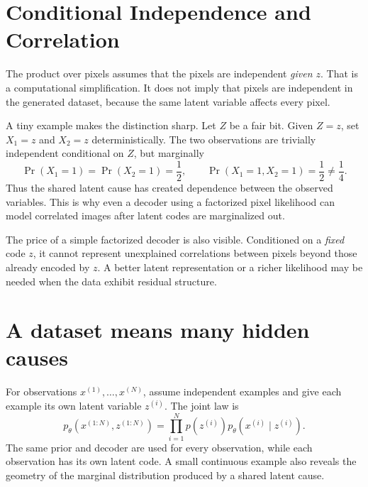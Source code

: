 \section{Conditional Independence and Correlation}

The product over pixels assumes that the pixels are independent \emph{given \(z\)}. That is a computational simplification. It does not imply that pixels are independent in the generated dataset, because the same latent variable affects every pixel.

A tiny example makes the distinction sharp. Let \(Z\) be a fair bit. Given \(Z=z\), set \(X_1=z\) and \(X_2=z\) deterministically. The two observations are trivially independent conditional on \(Z\), but marginally
\[
 \Pr(X_1=1)=\Pr(X_2=1)=\frac12,\qquad
 \Pr(X_1=1,X_2=1)=\frac12
 \ne\frac14.
\]
Thus the shared latent cause has created dependence between the observed variables. This is why even a decoder using a factorized pixel likelihood can model correlated images after latent codes are marginalized out.

The price of a simple factorized decoder is also visible. Conditioned on a \emph{fixed} code \(z\), it cannot represent unexplained correlations between pixels beyond those already encoded by \(z\). A better latent representation or a richer likelihood may be needed when the data exhibit residual structure.

\section{A dataset means many hidden causes}

For observations \(x^{(1)},\ldots,x^{(N)}\), assume independent examples and give each example its own latent variable \(z^{(i)}\). The joint law is
\[
 p_\theta(x^{(1:N)},z^{(1:N)})
 =\prod_{i=1}^{N}
 p(z^{(i)})p_\theta(x^{(i)}\mid z^{(i)}).
\]
The same prior and decoder are used for every observation, while each observation has its own latent code. A small continuous example also reveals the geometry of the marginal distribution produced by a shared latent cause.

